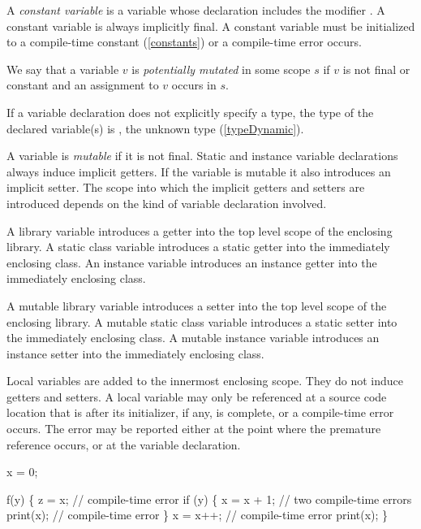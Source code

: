 \documentclass{article}
\begin{document}
\LMHash{}
A {\em constant variable} is a variable whose declaration includes the modifier \CONST{}. A constant variable is always implicitly final. A constant variable must be initialized to a compile-time constant (\ref{constants}) or a compile-time error occurs.

\LMHash{}
We say that a variable $v$ is {\em potentially mutated} in some scope $s$ if $v$ is not final or constant and an assignment to $v$ occurs in $s$.

\LMHash{}
If a variable declaration does not explicitly specify a type, the type of the declared variable(s) is  \DYNAMIC{}, the unknown type (\ref{typeDynamic}).

\LMHash{}
A variable is {\em mutable} if it is not final.
Static and instance variable declarations always induce implicit getters. If the variable is mutable it also introduces an implicit setter.
The scope into which the implicit getters and setters are introduced depends on the kind of variable declaration involved.

\LMHash{}
A library variable introduces a getter into the top level scope of the enclosing library. A static class variable introduces a static getter into the immediately enclosing class. An instance variable introduces an instance getter into the immediately enclosing class.

\LMHash{}
A mutable library variable introduces a setter into the top level scope of the enclosing library. A mutable static class variable introduces a static setter into the immediately enclosing class. A mutable instance variable introduces an instance setter into the immediately enclosing class.

\LMHash{}
Local variables are added to the innermost enclosing scope.  They do not induce getters and setters.  A local variable may only be referenced at a source code location that is after its initializer, if any, is complete, or a compile-time error occurs.  The error may be reported either at the point where the premature reference occurs, or at the variable declaration.



\begin{dartCode}
\VAR{} x = 0;

f(y) \{
  \VAR{} z = x; // compile-time error
  if (y) \{
    x = x + 1; // two compile-time errors
    print(x); // compile-time error
  \}
 \VAR{} x = x++; // compile-time error
 print(x);
\}
\end{dartCode}
\end{document}
